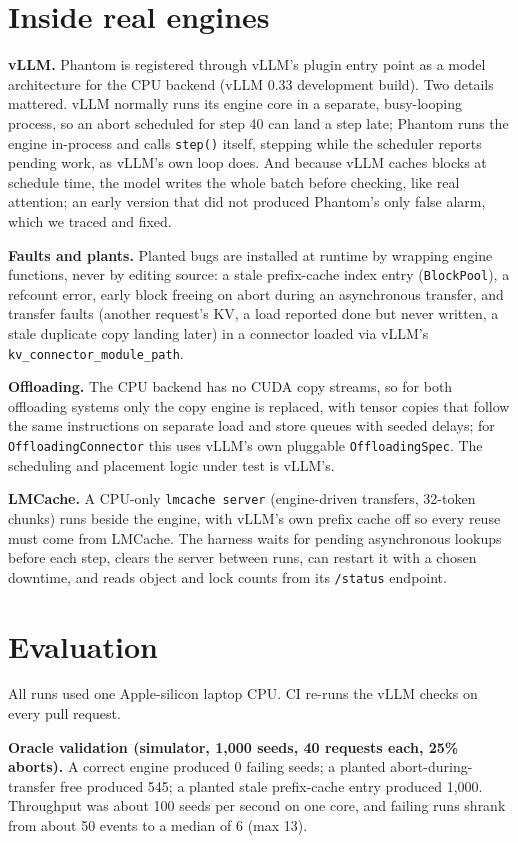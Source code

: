 \documentclass[10pt]{article}
\newcommand{\code}[1]{\texttt{\small #1}}
\begin{document}
\section{Inside real engines}\label{sec:real}
\textbf{vLLM.} Phantom is registered through vLLM's plugin entry point as a
model architecture for the CPU backend (vLLM 0.33 development build). Two
details mattered. vLLM normally runs its engine core in a separate,
busy-looping process, so an abort scheduled for step 40 can land a step
late; Phantom runs the engine in-process and calls \code{step()} itself,
stepping while the scheduler reports pending work, as vLLM's own loop does.
And because vLLM caches blocks at schedule time, the model writes the whole
batch before checking, like real attention; an early version that did not
produced Phantom's only false alarm, which we traced and fixed.

\textbf{Faults and plants.} Planted bugs are installed at runtime by
wrapping engine functions, never by editing source: a stale prefix-cache
index entry (\code{BlockPool}), a refcount error, early block freeing on
abort during an asynchronous transfer, and transfer faults (another
request's KV, a load reported done but never written, a stale duplicate
copy landing later) in a connector loaded via vLLM's
\code{kv\_connector\_module\_path}.

\textbf{Offloading.} The CPU backend has no CUDA copy streams, so for both
offloading systems only the copy engine is replaced, with tensor copies
that follow the same instructions on separate load and store queues with
seeded delays; for \code{OffloadingConnector} this uses vLLM's own pluggable
\code{OffloadingSpec}. The scheduling and placement logic under test is
vLLM's.

\textbf{LMCache.} A CPU-only \code{lmcache server} (engine-driven transfers,
32-token chunks) runs beside the engine, with vLLM's own prefix cache off so
every reuse must come from LMCache. The harness waits for pending
asynchronous lookups before each step, clears the server between runs, can
restart it with a chosen downtime, and reads object and lock counts from its
\code{/status} endpoint.

\section{Evaluation}\label{sec:eval}
All runs used one Apple-silicon laptop CPU. CI re-runs the vLLM checks on
every pull request.

\textbf{Oracle validation (simulator, 1,000 seeds, 40 requests each, 25\%
aborts).} A correct engine produced 0 failing seeds; a planted
abort-during-transfer free produced 545; a planted stale prefix-cache entry
produced 1,000. Throughput was about 100 seeds per second on one core, and
failing runs shrank from about 50 events to a median of 6 (max 13).
\end{document}
